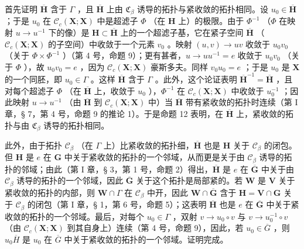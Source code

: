 首先证明 \(\overline{\mathbf{H}}\) 含于 \(\Gamma\) ，且 \(\overline{\mathbf{H}}\) 上由 \(\mathfrak{C}_{\beta}\) 诱导的拓扑与紧收敛的拓扑相同。设 \(u_0 \in \overline{\mathbf{H}}\) ；于是 \(u_0\) 在 \(\mathcal{C}_c(\mathbf{X}; \mathbf{X})\) 中是超滤子 \(\Phi\) （在 \(\mathbf{H}\) 上）的极限。由于 \(\Phi^{-1}\) （\(\Phi\) 在映射 \(u \to u^{-1}\) 下的像）是 \(\mathbf{H} \subset \overline{\mathbf{H}}\) 上的一个超滤子基，它在紧子空间 \(\overline{\mathbf{H}}\) （\(\mathcal{C}_c(\mathbf{X}; \mathbf{X})\) 的子空间）中收敛于一个元素 \(v_0\) 。映射 \((u, v) \to uv\) 收敛于 \(u_0 v_0\) （关于 \(\Phi \times \Phi^{-1}\) ）（第 4 号，命题 9）；更有甚者，\(u \to uu^{-1} = e\) 收敛于 \(u_0 v_0\) （关于 \(\Phi\) ），故 \(u_0 v_0 = e\) ，因为 \(\mathcal{C}_c(\mathbf{X}; \mathbf{X})\) 豪斯多夫。同样 \(v_0 u_0 = e\) ；于是 \(u_0\) 是 \(\mathbf{X}\) 的一个同胚，即 \(u_0 \in \Gamma\) 。这样 \(\overline{\mathbf{H}}\) 含于 \(\Gamma\) 。此外，这个论证表明 \(\overline{\mathbf{H}}^{-1} = \overline{\mathbf{H}}\) ，且对每个超滤子 \(\Phi\) （在 \(\overline{\mathbf{H}}\) 上，收敛于 \(u_0\) ），\(\Phi^{-1}\) 在 \(\mathcal{C}_c(\mathbf{X}; \mathbf{X})\) 中收敛于 \(u_0^{-1}\) ；因此映射 \(u \to u^{-1}\) （由 \(\overline{\mathbf{H}}\) 到 \(\mathcal{C}_c(\mathbf{X}; \mathbf{X})\) 中）当 \(\overline{\mathbf{H}}\) 带有紧收敛的拓扑时连续（第 I 章，§ 7，第 4 号，命题 9 的推论 1）。于是命题 12 表明，在 \(\overline{\mathbf{H}}\) 上，紧收敛的拓扑与由 \(\mathfrak{C}_{\beta}\) 诱导的拓扑相同。

此外，由于拓扑 \(\mathcal{C}_{\beta}\) （在 \(\Gamma\) 上）比紧收敛的拓扑细，\(\overline{\mathbf{H}}\) 也是 \(\mathbf{H}\) 关于 \(\mathcal{C}_{\beta}\) 的闭包。但 \(\mathbf{H}\) 是 \(e\) 在 \(\mathbf{G}\) 中关于紧收敛的拓扑的一个邻域，从而更是关于由 \(\mathcal{C}_{\beta}\) 诱导的拓扑的邻域；由此（第 I 章，§ 3，第 1 号，命题 2）得出，\(\overline{\mathbf{H}}\) 是 \(e\) 在 \(\overline{\mathbf{G}}\) 中关于由 \(\mathcal{C}_{\beta}\) 诱导的拓扑的一个邻域，因此 \(\overline{\mathbf{G}}\) 关于这个拓扑是局部紧的。若 \(\mathbf{W}\) 是 \(\mathbf{V}\) 关于紧收敛的拓扑的内部，则 \(\mathbf{W} \cap \Gamma\) 在 \(\mathcal{C}_{\beta}\) 中开，因此 \(\mathbf{W} \cap \overline{\mathbf{G}}\) 含于 \(\mathbf{H} = \mathbf{V} \cap \mathbf{G}\) 关于 \(\mathcal{C}_{\beta}\) 的闭包（第 I 章，§ 1，第 6 号，命题 5）；这表明 \(\overline{\mathbf{H}}\) 也是 \(e\) 在 \(\overline{\mathbf{G}}\) 中关于紧收敛的拓扑的一个邻域。最后，对每个 \(u_{0} \in \Gamma\) ，双射 \(v \to u_{0} \circ v\) 与 \(v \to u_{0}^{-1} \circ v\) （由 \(\mathcal{C}_{c}(\mathbf{X}; \mathbf{X})\) 到其自身上）连续（第 4 号，命题 9），因此，若 \(u_{0} \in \overline{G}\) ，则 \(u_{0}\overline{H}\) 是 \(u_{0}\) 在 \(\overline{G}\) 中关于紧收敛的拓扑的一个邻域。证明完成。

